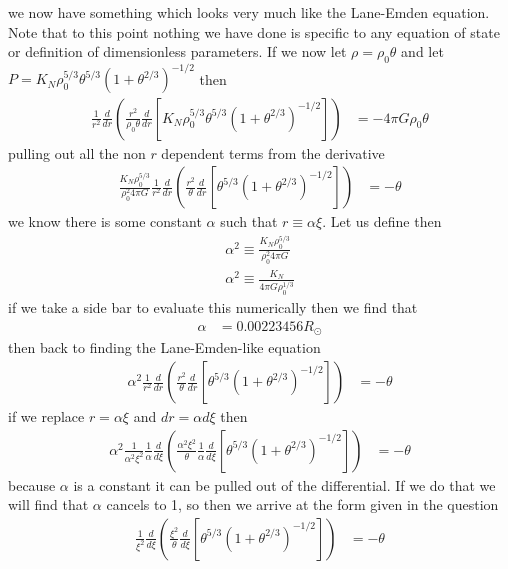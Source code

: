 we now have something which looks very much like the Lane-Emden equation. Note that to this point nothing we have done is specific to any equation of state or definition of dimensionless parameters. If we now let $\rho=\rho_{0}\theta$ and let $P=K_{N}\rho_{0}^{5/3}\theta^{5/3}(1+\theta^{2/3})^{-1/2}$ then
\begin{align*}
    \frac{1}{r^{2}}\frac{d}{dr}\left(\frac{r^{2}}{\rho_{0}\theta}\frac{d}{dr}\left[K_{N}\rho_{0}^{5/3}\theta^{5/3}(1+\theta^{2/3})^{-1/2}\right]\right) &= -4\pi G\rho_{0}\theta
\end{align*}
pulling out all the non $r$ dependent terms from the derivative
\begin{align*}
    \frac{K_{N}\rho_{0}^{5/3}}{\rho_{0}^{2}4\pi G}\frac{1}{r^{2}}\frac{d}{dr}\left(\frac{r^{2}}{\theta}\frac{d}{dr}\left[\theta^{5/3}(1+\theta^{2/3})^{-1/2}\right]\right) &= -\theta
\end{align*}
we know there is some constant $\alpha$ such that $r\equiv \alpha \xi$. Let us define then 
\begin{align*}
    \alpha^{2} \equiv \frac{K_{N}\rho_{0}^{5/3}}{\rho_{0}^{2}4\pi G} \\
    \alpha^{2} \equiv \frac{K_{N}}{4\pi G\rho_{0}^{1/3}}
\end{align*}
if we take a side bar to evaluate this numerically then we find that
\begin{align*}
    \alpha &= 0.00223456 R_{\odot}
\end{align*}
then back to finding the Lane-Emden-like equation 
\begin{align*}
       \alpha^{2}\frac{1}{r^{2}}\frac{d}{dr}\left(\frac{r^{2}}{\theta}\frac{d}{dr}\left[\theta^{5/3}(1+\theta^{2/3})^{-1/2}\right]\right) &= -\theta
\end{align*}
if we replace $r=\alpha\xi$ and $dr=\alpha d\xi$ then
\begin{align*}
    \alpha^{2}\frac{1}{\alpha^{2}\xi^{2}}\frac{1}{\alpha}\frac{d}{d\xi}\left(\frac{\alpha^{2}\xi^{2}}{\theta}\frac{1}{\alpha}\frac{d}{d\xi}\left[\theta^{5/3}(1+\theta^{2/3})^{-1/2}\right]\right) &= -\theta
\end{align*}
because $\alpha$ is a constant it can be pulled out of the differential. If we do that we will find that $\alpha$ cancels to 1, so then we arrive at the form given in the question
\begin{align*}
   \frac{1}{\xi^{2}}\frac{d}{d\xi}\left(\frac{\xi^{2}}{\theta}\frac{d}{d\xi}\left[\theta^{5/3}(1+\theta^{2/3})^{-1/2}\right]\right) &= -\theta
\end{align*}
